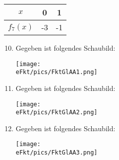 \begin{minipage}{\textwidth}
\begin{Exercise}[title={Stelle jeweils eine Funktionsgleichung vom passenden Typ auf}, label=eFktFGlAA1]
\begin{minipage}[t][30cm][t]{0.49\textwidth}
\begin{enumerate}[label=\alph*)]
				\begin{tabular}{c|cc}
					\(x\)&0&1\\
					\hline
					\(f_7(x)\)&-3&-1\\
				\end{tabular}
			\end{enumerate}
		\end{minipage}
		\begin{minipage}[t][30cm][t]{0.49\textwidth}
			\begin{enumerate}[label=\alph*)]
				\setcounter{enumi}{9}
				\item Gegeben ist folgendes Schaubild:\\
				\begin{minipage}{0.9\textwidth}
					\texttt{[image: \\eFkt/pics/FktGlAA1.png]}
				\end{minipage}
				\item Gegeben ist folgendes Schaubild:\\
				\begin{minipage}{0.9\textwidth}
					\texttt{[image: \\eFkt/pics/FktGlAA2.png]}
				\end{minipage}
				\item Gegeben ist folgendes Schaubild:\\
				\begin{minipage}{0.9\textwidth}
					\texttt{[image: \\eFkt/pics/FktGlAA3.png]}
				\end{minipage}
			\end{enumerate}
		\end{minipage}
	\end{Exercise}
\end{minipage}
\newpage

